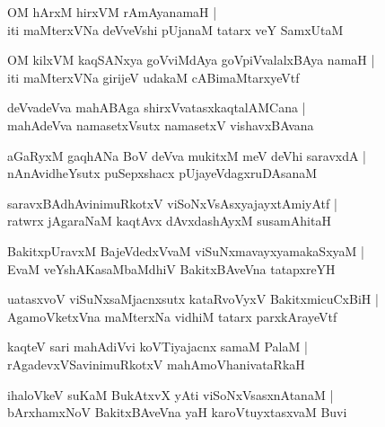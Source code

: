 \documentclass[twoside,12pt,openright]{book}
\newcounter{shloka}[chapter]
\begin{document}
\begin{shloka}%
OM hArxM hirxVM rAmAyanamaH |\\
iti maMterxVNa deVveVshi pUjanaM tatarx veY SamxUtaM 
\end{shloka}

\begin{shloka}%
OM kilxVM kaqSANxya goVviMdAya goVpiVvalalxBAya namaH |\\
iti maMterxVNa girijeV udakaM cABimaMtarxyeVtf
\end{shloka}

\begin{shloka}%
deVvadeVva mahABAga shirxVvatasxkaqtalAMCana |\\
mahAdeVva namasetxVsutx namasetxV vishavxBAvana 
\end{shloka}

\begin{shloka}%
aGaRyxM gaqhANa BoV deVva mukitxM meV deVhi saravxdA |\\
nAnAvidheYsutx puSepxshacx pUjayeVdagxruDAsanaM
\end{shloka}

\begin{shloka}%
saravxBAdhAvinimuRkotxV viSoNxVsAsxyajayxtAmiyAtf |\\
ratwrx jAgaraNaM kaqtAvx dAvxdashAyxM susamAhitaH 
\end{shloka}

\begin{shloka}%
BakitxpUravxM BajeVdedxVvaM viSuNxmavayxyamakaSxyaM |\\
EvaM veYshAKasaMbaMdhiV BakitxBAveVna tatapxreYH 
\end{shloka}

\begin{shloka}%
uatasxvoV viSuNxsaMjacnxsutx kataRvoVyxV BakitxmicuCxBiH |\\
AgamoVketxVna maMterxNa vidhiM tatarx parxkArayeVtf
\end{shloka}

\begin{shloka}%
kaqteV sari mahAdiVvi koVTiyajacnx samaM PalaM |\\
rAgadevxVSavinimuRkotxV mahAmoVhanivataRkaH 
\end{shloka}

\begin{shloka}%
ihaloVkeV suKaM BukAtxvX yAti viSoNxVsasxnAtanaM |\\
bArxhamxNoV BakitxBAveVna yaH karoVtuyxtasxvaM Buvi 
\end{shloka}
\end{document}
